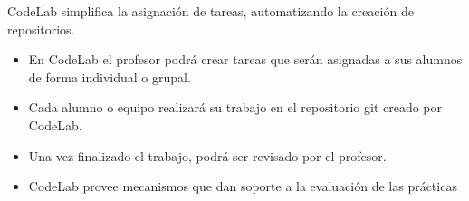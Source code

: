 \documentclass{beamer}
\begin{document}
\begin{frame}
    CodeLab simplifica la asignación de tareas, automatizando la creación de repositorios.
  \begin{itemize}
    \item En CodeLab el profesor podrá crear tareas que serán asignadas a sus alumnos de forma individual o grupal. 
    \item Cada alumno o equipo realizará su trabajo en el repositorio git creado por CodeLab. 
    \item Una vez finalizado el trabajo, podrá ser revisado por el profesor.
    \item CodeLab provee mecanismos que dan soporte a la evaluación de las prácticas
  \end{itemize}

\end{frame}

%  
  
\end{document}
